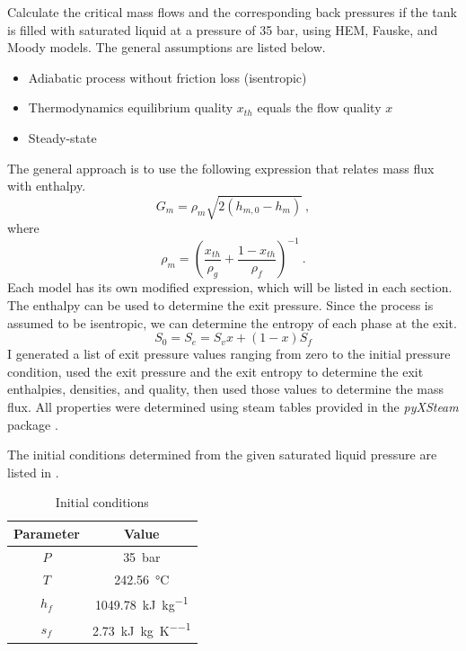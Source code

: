 \documentclass[11pt]{article}
\begin{document}
Calculate the critical mass flows and the corresponding back pressures if the tank is filled with saturated liquid at a pressure of 35 bar, using HEM, Fauske, and Moody models. The general assumptions are listed below.
\begin{itemize}
    \item Adiabatic process without friction loss (isentropic)
    \item Thermodynamics equilibrium quality $x_{th}$ equals the flow quality $x$
    \item Steady-state
\end{itemize}
% 
The general approach is to use the following expression that relates mass flux with enthalpy.
\begin{equation}
    G_m = \rho_m \sqrt{2 \left( h_{m,0} - h_m \right)}\:,
\end{equation}
where
\begin{equation}
    \rho_m = \left( \frac{x_{th}}{\rho_g} + \frac{1-x_{th}}{\rho_f} \right)^{-1}\:.
\end{equation}
Each model has its own modified expression, which will be listed in each section. The enthalpy can be used to determine the exit pressure. Since the process is assumed to be isentropic, we can determine the entropy of each phase at the exit.
\begin{equation}
    S_0 = S_e = S_v x + \left( 1-x \right) S_f
\end{equation}
I generated a list of exit pressure values ranging from zero to the initial pressure condition, used the exit pressure and the exit entropy to determine the exit enthalpies, densities, and quality, then used those values to determine the mass flux. All properties were determined using steam tables provided in the \textit{pyXSteam} package \cite{pyXSteam,XSteam,IAPWS97}.

The initial conditions determined from the given saturated liquid pressure are listed in .

\begin{table}[htbp]
    \centering
    \caption{Initial conditions}
    \begin{tabular}{cc}
        \toprule
        Parameter & Value\\
        \midrule
        $P$ & \SI{35}{bar}\\
        $T$ & \SI{242.56}{\celsius}\\
        $h_f$ & \SI{1049.78}{\kilo\joule\per\kilo\gram}\\
        $s_f$ & \SI{2.73}{\kilo\joule\per\kilo\gram\per\kelvin}\\
        \bottomrule
    \end{tabular}
    \label{tab:init}
\end{table}
\end{document}
